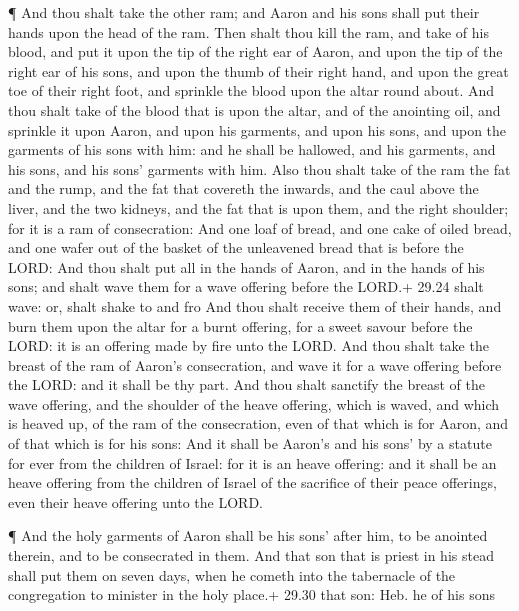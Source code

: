  ¶ And thou shalt take the other ram; and Aaron and his
sons shall put their hands upon the head of the ram.  Then
shalt thou kill the ram, and take of his blood, and put it upon the tip
of the right ear of Aaron, and upon the tip of the right ear of his
sons, and upon the thumb of their right hand, and upon the great toe of
their right foot, and sprinkle the blood upon the altar round about.
 And thou shalt take of the blood that is upon the altar,
and of the anointing oil, and sprinkle it upon Aaron, and upon his
garments, and upon his sons, and upon the garments of his sons with him:
and he shall be hallowed, and his garments, and his sons, and his sons'
garments with him.  Also thou shalt take of the ram the fat
and the rump, and the fat that covereth the inwards, and the caul above
the liver, and the two kidneys, and the fat that is upon them, and the
right shoulder; for it is a ram of consecration:  And one
loaf of bread, and one cake of oiled bread, and one wafer out of the
basket of the unleavened bread that is before the LORD: 
And thou shalt put all in the hands of Aaron, and in the hands of his
sons; and shalt wave them for a wave offering before the LORD.+ 29.24
shalt wave: or, shalt shake to and fro  And thou shalt
receive them of their hands, and burn them upon the altar for a burnt
offering, for a sweet savour before the LORD: it is an offering made by
fire unto the LORD.  And thou shalt take the breast of the
ram of Aaron's consecration, and wave it for a wave offering before the
LORD: and it shall be thy part.  And thou shalt sanctify
the breast of the wave offering, and the shoulder of the heave offering,
which is waved, and which is heaved up, of the ram of the consecration,
even of that which is for Aaron, and of that which is for his sons:
 And it shall be Aaron's and his sons' by a statute for
ever from the children of Israel: for it is an heave offering: and it
shall be an heave offering from the children of Israel of the sacrifice
of their peace offerings, even their heave offering unto the LORD.

 ¶ And the holy garments of Aaron shall be his sons' after
him, to be anointed therein, and to be consecrated in them.
 And that son that is priest in his stead shall put them on
seven days, when he cometh into the tabernacle of the congregation to
minister in the holy place.+ 29.30 that son: Heb. he of his sons

